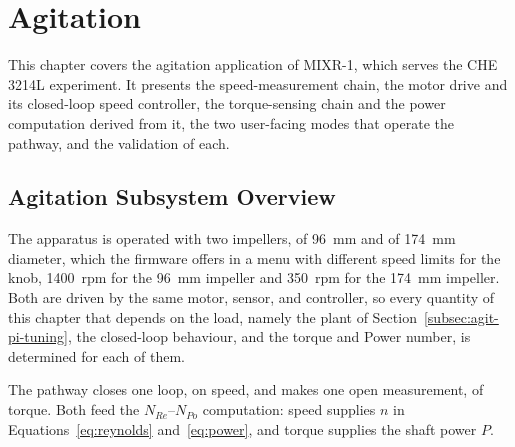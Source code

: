 
\chapter{Agitation}
\label{ch:agitation}

\ifpdf
    \graphicspath{{Chapter5/Figs/Raster/}{Chapter5/Figs/PDF/}{Chapter5/Figs/}}
\else
    \graphicspath{{Chapter5/Figs/Vector/}{Chapter5/Figs/}}
\fi

This chapter covers the agitation application of MIXR-1, which serves the CHE 3214L experiment. It presents the speed-measurement chain, the motor drive and its closed-loop speed controller, the torque-sensing chain and the power computation derived from it, the two user-facing modes that operate the pathway, and the validation of each.


\section{Agitation Subsystem Overview}
\label{sec:agit-overview}


The apparatus is operated with two impellers, of 96~mm and of 174~mm diameter, which the firmware offers in a menu with different speed limits for the knob, 1400~rpm for the 96~mm impeller and 350~rpm for the 174~mm impeller. Both are driven by the same motor, sensor, and controller, so every quantity of this chapter that depends on the load, namely the plant of Section~\ref{subsec:agit-pi-tuning}, the closed-loop behaviour, and the torque and Power number, is determined for each of them.

The pathway closes one loop, on speed, and makes one open measurement, of torque. Both feed the $N_{Re}$--$N_{Po}$ computation: speed supplies $n$ in Equations~\ref{eq:reynolds} and~\ref{eq:power}, and torque supplies the shaft power $P$.


